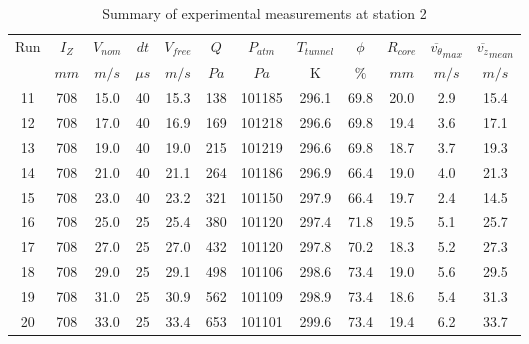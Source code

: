 \begin{table}[H]
\begin{center}
\begin{tabular}{|cccccccccccc|}
	\hline
	Run & $I_Z$ & $V_{nom}$ & $dt$ & $V_{free}$ & $Q$ & $P_{atm}$ & $T_{tunnel}$ & $\phi$ & $R_{core}$ & $\overline{v_{\theta}}_{max}$ & $\overline{v_{z}}_{mean}$\\
	  & $mm$ & $m/s$ & $\mu s$ & $m/s$ & $Pa$ & $Pa$ & K & $\%$ & $mm$ & $m/s$ & $m/s$\\
	\hline
	11 & 708 & 15.0 & 40 & 15.3 & 138 & 101185 & 296.1 & 69.8 & 20.0 & 2.9 & 15.4\\
	12 & 708 & 17.0 & 40 & 16.9 & 169 & 101218 & 296.6 & 69.8 & 19.4 & 3.6 & 17.1\\
	13 & 708 & 19.0 & 40 & 19.0 & 215 & 101219 & 296.6 & 69.8 & 18.7 & 3.7 & 19.3\\
	14 & 708 & 21.0 & 40 & 21.1 & 264 & 101186 & 296.9 & 66.4 & 19.0 & 4.0 & 21.3\\
	15 & 708 & 23.0 & 40 & 23.2 & 321 & 101150 & 297.9 & 66.4 & 19.7 & 2.4 & 14.5\\
	16 & 708 & 25.0 & 25 & 25.4 & 380 & 101120 & 297.4 & 71.8 & 19.5 & 5.1 & 25.7\\
	17 & 708 & 27.0 & 25 & 27.0 & 432 & 101120 & 297.8 & 70.2 & 18.3 & 5.2 & 27.3\\
	18 & 708 & 29.0 & 25 & 29.1 & 498 & 101106 & 298.6 & 73.4 & 19.0 & 5.6 & 29.5\\
	19 & 708 & 31.0 & 25 & 30.9 & 562 & 101109 & 298.9 & 73.4 & 18.6 & 5.4 & 31.3\\
	20 & 708 & 33.0 & 25 & 33.4 & 653 & 101101 & 299.6 & 73.4 & 19.4 & 6.2 & 33.7\\
	\hline
\end{tabular}
\caption{Summary of experimental measurements at station 2}
\label{table:experiment_results_2}
\end{center}
\end{table}
